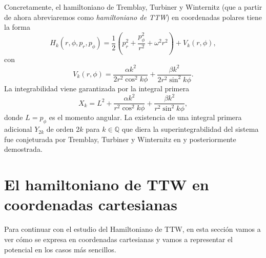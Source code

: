 \documentclass[12pt,a4paper,twoside]{article}
\theoremstyle{definition} \newtheorem{defn}[thm]{Definición}
\theoremstyle{definition} \newtheorem{ejemplo}[thm]{Ejemplo}
\theoremstyle{definition} \newtheorem{ejercicio}[thm]{Ejercicio}
\theoremstyle{remark} \newtheorem*{obs}{Observación}
\def\QQ{\mathbb{Q}}
\begin{document}
Concretamente, el hamiltoniano de Tremblay, Turbiner y Winternitz (que a partir de ahora abreviaremos como \emph{hamiltoniano de TTW}) en coordenadas polares tiene la forma 
\begin{equation}
  H_k(r,\phi,p_r,p_{\phi})=\frac{1}{2}\left( p_r^2+\frac{p^2_{\phi}}{r^2} +\omega^2 r^2 \right) + V_k(r,\phi),
\end{equation}
con
\begin{equation}
  V_k(r,\phi)=\frac{\alpha k^2}{2r^2\cos^2 k\phi}+\frac{\beta k^2}{2r^2\sin^2 k\phi}.
  \label{eq:TTW}
\end{equation}
La integrabilidad viene garantizada por la integral primera
\begin{equation}
  X_k=L^2+\frac{\alpha k^2}{r^2\cos^2 k\phi}+\frac{\beta k^2}{r^2\sin^2 k\phi},
\end{equation}
donde $L=p_{\phi}$ es el momento angular. La existencia de una integral primera adicional $Y_{2k}$ de orden $2k$ para $k\in \QQ$ que diera la superintegrabilidad del sistema fue conjeturada por Tremblay, Turbiner y Winternitz en \cite{ttw1} y posteriormente demostrada.

\section{El hamiltoniano de TTW en coordenadas cartesianas}
Para continuar con el estudio del Hamiltoniano de TTW, en esta sección vamos a ver cómo se expresa en coordenadas cartesianas y vamos a representar el potencial en los casos más sencillos.
\end{document}
